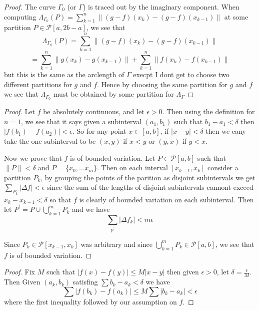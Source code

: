 \documentclass[11pt,largemargins]{homework}
\begin{document}
\begin{alphaparts}
\questionpart
\begin{proof} 
The curve $\Gamma_0$ (or $\Gamma$) is traced out by the imaginary component. When computing 
$\Lambda_{\Gamma_0}(P) = \sum_{k=1}^n \|(g-f)(x_k) - (g- f)(x_{k-1})\|$ at some partition $P \in \mathcal{P}[a,2b-a]$, we see that 
\[\Lambda_{\Gamma_0}(P) = \sum_{k=1}^n \|(g-f)(x_k) - (g- f)(x_{k-1})\|\] 
\[= \sum_{k=1}^n\|g(x_k) - g(x_{k-1}) \| + \sum_{k=1}^n \|f(x_k) - f(x_{k-1})\| \] 
but this is the same as the arclength of $\Gamma$ execpt I dont get to choose two different partitions for $g$ and $f$. Hence by choosing the same partition 
for $g$ and $f$ we see that $\Lambda_{\Gamma_0}$ must be obtained by some partition for $\Lambda_{\Gamma}$
\end{proof}

	\end{alphaparts}



\begin{proof} 
	Let $f$ be absolutely continuous, and let $\epsilon > 0$. Then using the definition for $n =1$, we see that it says given a subinterval $(a_1, b_1)$ such that $b_1 - a_1 < \delta$ then $|f(b_1) - f(a_2)| <  \epsilon$. So for any point $x \in [a,b]$, if $|x - y| < \delta $ then we cany take the one subinterval to be $(x, y)$ if $x < y$ or $(y, x)$ if $y < x$. 

	Now we prove that $f$ is of bounded variation. Let $P \in \mathcal{P}[a,b]$ such that $\| P\| < \delta$ and $P = \{x_0, \dots x_m\}$. 
	Then on each interval 
	$[x_{k-1}, x_k]$ consider a partition $P_k$, by grouping the points of the parition as disjoint subintervals we 
	get $\sum_{P_k} |\Delta f| < \epsilon$ since the sum of the lengths of disjoint subintervals 
	cannont exceed $x_k - x_{k-1} < \delta$ so that $f$ is clearly of bounded variation on each subinterval. 
	Then let $P^\prime = P \cup \bigcup_{k=1}^m P_k$ and we have 
	\[\sum_{p^\prime} |\Delta f_k| < m \epsilon \] 

	Since $P_k \in \mathcal{P}[x_{k-1}, x_k]$ was arbitrary and since $\bigcup_{k=1}^m P_k \in \mathcal{P}[a,b]$, we see that $f$ is of bounded variation.
\end{proof}


\begin{proof} 

Fix $M$ such that $|f(x) - f(y)| \leq M |x - y|$ then given $\epsilon > 0$, let $\delta = \frac{\epsilon}{M}$. Then 
Given $(a_k, b_k)$ satisfing $\sum b_k - a_k < \delta$ we have 
\[\sum |f(b_k) - f(a_k)| \leq M \sum |b_k - a_k| < \epsilon\] 
where the first inequality followed by our assumption on $f$.
\end{proof}
\end{document}
